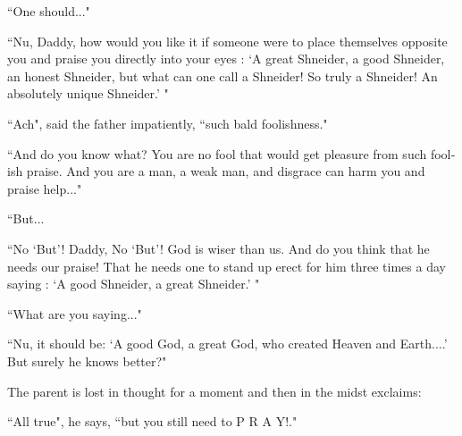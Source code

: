 \documentclass{article}
\begin{document}
\begin{pairs}
\begin{Leftside}
\begin{english}
``One should..."

``Nu, Daddy, how would you like it if someone were to place themselves opposite you and praise you directly
into your eyes : `A great Shneider, a good Shneider, an honest Shneider, but what can one call a Shneider! So truly a
Shneider! An absolutely unique Shneider.' "

``Ach", said the father impatiently, ``such bald foolishness."

``And do you know what? You are no fool that would get pleasure from such foolish praise. And you
are a man, a weak man, and disgrace can harm you and praise help..."

``But...

``No `But'! Daddy, No `But'! God is wiser than us. And do you think that he needs our praise! That he needs one
to stand up erect for him three times a day saying : `A good Shneider, a great Shneider.' "

``What are you saying..."

``Nu, it should be: `A good God, a great God, who created Heaven and Earth....' But surely he knows better?"

The parent is lost in thought for a moment and then in the midst exclaims:

``All true", he says, ``but you still need to P R A Y!." 

\endnumbering
\end{english}
\end{Leftside}
\end{pairs}
\Columns
\end{document}
